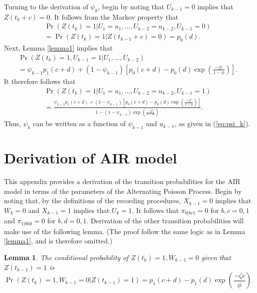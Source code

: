 \documentclass[man, noextraspace, floatsintext]{apa6}\usepackage[]{graphicx}\usepackage[]{color}
\newtheorem{lemma}{Lemma}
\begin{document}
Turning to the derivation of $\psi_k$, begin by noting that $U_{k-1} = 0$ implies that $Z(t_k + c) = 0$. 
It follows from the Markov property that 
\begin{multline*}
\Pr\left(Z(t_k) = 1 \left| U_1 = u_1,...,U_{k-2} = u_{k-2}, U_{k-1} = 0 \right.\right) \\ 
= \Pr\left(Z(t_k) = 1 \left| Z(t_{k-1} + c) = 0 \right.\right) = p_0(d).
\end{multline*}
Next, Lemma \ref{lemma1} implies that \begin{multline*}
\Pr\left(Z(t_k) = 1, U_{k-1} = 1 \left| U_1,...,U_{k-2} \right.\right) \\
= \psi_{k-1} p_1(c + d) + (1 - \psi_{k-1}) \left[p_0(c + d) - p_0(d) \exp\left(\frac{- \zeta c}{1 - \phi}\right)\right].
\end{multline*}
It therefore follows that 
\begin{multline*}
\Pr\left(Z(t_k) = 1 \left| U_1 = u_1,...,U_{k-2} = u_{k-2}, U_{k-1} = 1 \right.\right) \\
= \frac{\psi_{k-1} p_1(c + d) + (1 - \psi_{k-1}) \left[p_0(c + d) - p_0(d) \exp\left(\frac{- \zeta c}{1 - \phi}\right)\right]}{1 - (1 - \psi_{k-1})\exp\left( \frac{-\zeta c}{1 - \phi}\right)}.
\end{multline*}
Thus, $\psi_k$ can be written as a function of $\psi_{k-1}$ and $u_{k-1}$, as given in (\ref{eq:psi_k}).

\section{Derivation of AIR model}
\label{app:AIR_derivation}

This appendix provides a derivation of the transition probabilities for the AIR model in terms of the parameters of the Alternating Poisson Process. Begin by noting that, by the definitions of the recording procedures, $X_{k-1} = 0$ implies that $W_k = 0$ and $X_{k-1} = 1$ implies that $U_k = 1$. It follows that $\pi_{0|bc1} = 0$ for $b,c = 0,1$ and $\pi_{1|b0d} = 0$ for $b,d=0,1$. Derivation of the other transition probabilities will make use of the following lemma. (The proof follow the same logic as in Lemma \ref{lemma1}, and is therefore omitted.)

\begin{lemma}
\label{lemma2}
The conditional probability of $Z(t_k) = 1, W_{k-1} = 0$ given that $Z(t_{k-1}) = 1$ is
\[
\Pr\left(Z(t_k) = 1, W_{k-1} = 0 \left| Z(t_{k-1}) = 1 \right.\right) = p_1(c + d) - p_1(d) \exp\left(\frac{- \zeta c}{\phi}\right). \]
\end{lemma}
\end{document}
